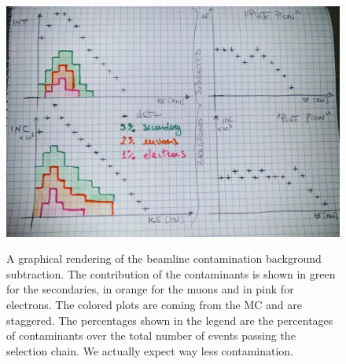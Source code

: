 \begin{figure}
\includegraphics[width=\textwidth,height=\textheight,keepaspectratio]{Chapter-4/Images/FakePlot.jpg}
\label{fig:backgroundSubtraction}
\caption{A graphical rendering of the beamline contamination background subtraction. The contribution of the contaminants is shown in green for the secondaries, in orange for the muons and in pink for electrons. The colored plots are coming from the MC and are staggered. The percentages shown in the legend are the percentages of contaminants over the total number of events  passing the selection chain. We actually expect way less contamination.}
\end{figure}



